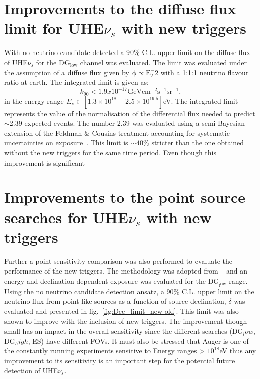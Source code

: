 \section*{Improvements to the diffuse flux limit for UHE$\nu_s$ with new triggers}
With no neutrino candidate detected a 90\% C.L. upper limit on the diffuse flux of UHE$\nu_s$ for the DG$\mathrm{_{low}}$ channel was evaluated. The limit was evaluated under the assumption of a diffuse flux given by $\mathrm{\phi \propto E_{\nu}^-2}$ with a 1:1:1 neutrino flavour ratio at earth. The integrated limit is given as:
\begin{equation}
    k_{90} < 1.9 x 10^{-17} \mathrm{GeV cm^{-2} s^{-1} sr^{-1}},
\end{equation}
in the energy range $E_{\nu} \in [1.3 \times 10^{18} - 2.5 \times 10^{19.5}]$eV. The integrated limit represents the value of the normalisation of the differential flux needed to predict $\sim$2.39 expected events. The number 2.39 was evaluated using a semi Bayesian extension of the Feldman \& Cousins treatment accounting for systematic uncertainties on exposure~\cite{Conrad:2002kn}. This limit is $\sim 40\%$ stricter than the one obtained without the new triggers for the same time period. Even though this improvement is significant 
\section*{Improvements to the point source searches for UHE$\nu_s$ with new triggers}
Further a point sensitivity comparison was also performed to evaluate the performance of the new triggers. The methodology was adopted from ~\cite{Aab_2019_point} and an energy and declination dependent exposure was evaluated for the DG$\mathrm{_{_low}}$ range. Using the no neutrino candidate detection ansatz, a 90\% C.L. upper limit on the neutrino flux from point-like sources as a function of source declination, $\delta$ was evaluated and presented in fig.~\ref{fig:Dec_limit_new old}. This limit was also shown to improve with the inclusion of new triggers. The improvement though small has an impact in the overall sensitivity since the different searches (DG$_low$, DG$_high$, ES) have different FOVs. It must also be stressed that Auger is one of the constantly running experiments sensitive to Energy ranges > $10^{18}$eV thus any improvement to its sensitivity is an important step for the potential future detection of UHE$\nu_s$.



